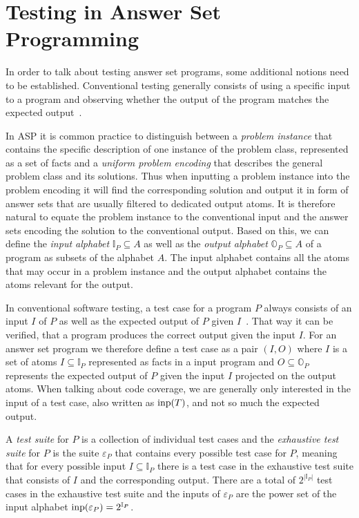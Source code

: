 \section{Testing in Answer Set Programming}
\label{sec:Preliminaries on answer set programming/Testing in Answer Set Programming}
In order to talk about testing answer set programs, some additional notions need to be established. Conventional testing generally consists of using a specific input to a program and observing whether the output of the program matches the expected output~\cite[71\psqq]{AO16}.

In ASP it is common practice to distinguish between a \emph{problem instance} that contains the specific description of one instance of the problem class, represented as a set of facts and a \emph{uniform problem encoding} that describes the general problem class and its solutions. Thus when inputting a problem instance into the problem encoding it will find the corresponding solution and output it in form of answer sets that are usually filtered to dedicated output atoms. It is therefore natural to equate the problem instance to the conventional input and the answer sets encoding the solution to the conventional output. Based on this, we can define the \emph{input alphabet} \(\mathbb{I}_P \subseteq A\) as well as the \emph{output alphabet} \(\mathbb{O}_P \subseteq A\) of a program as subsets of the alphabet $A$. The input alphabet contains all the atoms that may occur in a problem instance and the output alphabet contains the atoms relevant for the output.

In conventional software testing, a test case for a program $P$ always consists of an input $I$ of $P$ as well as the expected output of $P$ given $I$~\cite{ISO29119-1}. That way it can be verified, that a program produces the correct output given the input $I$. For an answer set program we therefore define a test case as a pair \((I, O)\) where $I$ is a set of atoms \(I \subseteq \mathbb{I}_P\) represented as facts in a input program and \(O \subseteq \mathbb{O}_P\) represents the expected output of $P$ given the input $I$ projected on the output atoms. When talking about code coverage, we are generally only interested in the input of a test case, also written as \(\operatorname{inp}(T)\), and not so much the expected output.

A \emph{test suite} for $P$ is a collection of individual test cases and the \emph{exhaustive test suite} for $P$ is the suite \(\varepsilon_P\) that contains every possible test case for $P$, meaning that for every possible input \(I \subseteq \mathbb{I}_P\) there is a test case in the exhaustive test suite that consists of $I$ and the corresponding output. There are a total of \(2^{|\mathbb{I}_P|}\) test cases in the exhaustive test suite and the inputs of $\varepsilon_P$ are the power set of the input alphabet \(\operatorname{inp}(\varepsilon_P) = 2^{\mathbb{I}_P}\).

